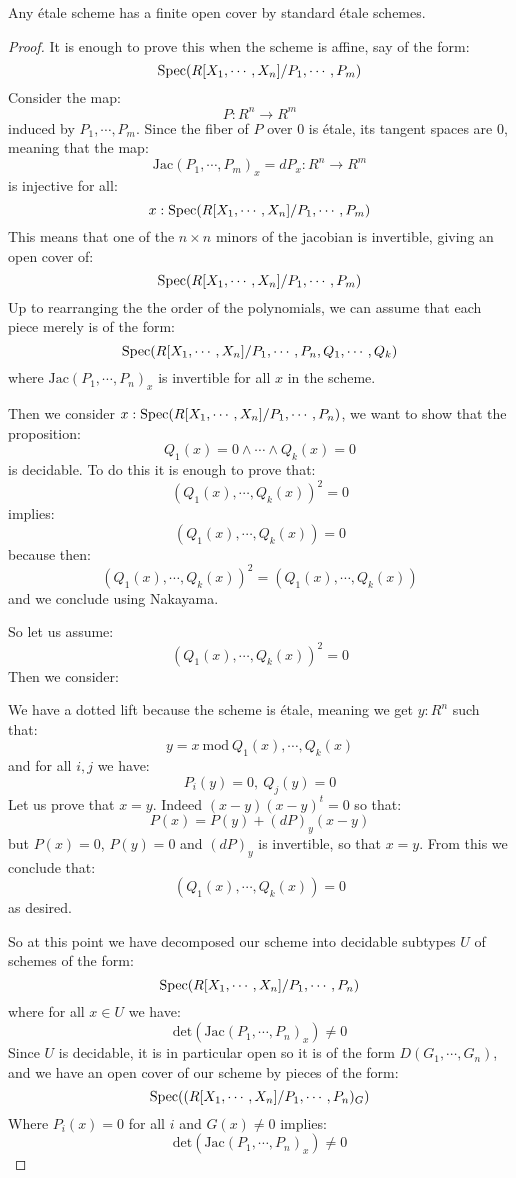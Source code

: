 \begin{proposition}\label{etale-are-locally-standard}
Any étale scheme has a finite open cover by standard étale schemes.
\end{proposition}

\begin{proof}
It is enough to prove this when the scheme is affine, say of the form:
\[\operatorname{Spec}(R[X_1,\cdots,X_n]/P_1,\cdots,P_m)\]
Consider the map:
\[P:R^n\to R^m\]
induced by $P_1,\cdots,P_m$. Since the fiber of $P$ over $0$ is étale, its tangent spaces are $0$, meaning that the map:
\[\mathrm{Jac}(P_1,\cdots,P_m)_x = dP_x : R^n\to R^m\]
is injective for all: 
\[x:\operatorname{Spec}(R[X_1,\cdots,X_n]/P_1,\cdots,P_m)\]
This means that one of the $n\times n$ minors of the jacobian is invertible, giving an open cover of:
\[\operatorname{Spec}(R[X_1,\cdots,X_n]/P_1,\cdots,P_m)\] 
Up to rearranging the the order of the polynomials, we can assume that each piece merely is of the form:
\[\operatorname{Spec}(R[X_1,\cdots,X_n]/P_1,\cdots,P_n,Q_1,\cdots,Q_k)\]
where $\mathrm{Jac}(P_1,\cdots,P_n)_x$ is invertible for all $x$ in the scheme.

Then we consider $x:\operatorname{Spec}(R[X_1,\cdots,X_n]/P_1,\cdots,P_n)$, we want to show that the proposition:
\[Q_1(x)=0\land \cdots\land Q_k(x)=0\]
is decidable. To do this it is enough to prove that: 
\[(Q_1(x),\cdots,Q_k(x))^2 = 0\] 
implies: 
\[(Q_1(x),\cdots,Q_k(x))=0\] 
because then:
\[(Q_1(x),\cdots,Q_k(x))^2 = (Q_1(x),\cdots,Q_k(x))\]
and we conclude using Nakayama. 

So let us assume: 
\[(Q_1(x),\cdots,Q_k(x))^2=0\]
Then we consider:
  \begin{center}
    \end{center}
    We have a dotted lift because the scheme is étale, meaning we get $y:R^n$ such that:
    \[y = x\ \mathrm{mod}\ Q_1(x),\cdots,Q_k(x)\]
    and for all $i,j$ we have:
    \[P_i(y) = 0,\ Q_j(y)=0\]
    Let us prove that $x=y$. Indeed $(x-y)(x-y)^t=0$ so that:
    \[P(x) = P(y) + (dP)_y (x-y)\]
    but $P(x)=0$, $P(y)=0$ and $(dP)_y$ is invertible, so that $x=y$. From this we conclude that:
    \[(Q_1(x),\cdots,Q_k(x)) = 0\]
    as desired.
    
    So at this point we have decomposed our scheme into decidable subtypes $U$ of schemes of the form:
    \[\operatorname{Spec}(R[X_1,\cdots,X_n]/P_1,\cdots,P_n)\]
    where for all $x\in U$ we have:
    \[\mathrm{det}(\mathrm{Jac}(P_1,\cdots,P_n)_x)\not=0\] 
    Since $U$ is decidable, it is in particular open so it is of the form $D(G_1,\cdots,G_n)$, and we have an open cover of our scheme by pieces of the form:
    \[\operatorname{Spec}((R[X_1,\cdots,X_n]/P_1,\cdots,P_n)_G)\]
    Where $P_i(x)=0$ for all $i$ and $G(x)\not=0$ implies:
    \[\mathrm{det}(\mathrm{Jac}(P_1,\cdots,P_n)_x)\not=0\]
    

\end{proof}

